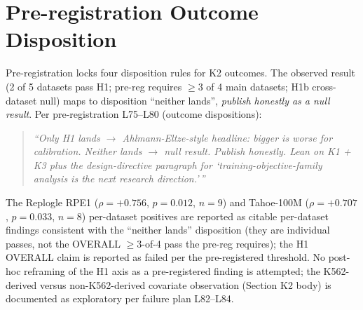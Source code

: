 \documentclass{article}
\begin{document}

\printAffiliationsAndNotice{}

\onecolumn
\appendix

\section{Pre-registration Outcome Disposition}
\label{app:prereg}

Pre-registration locks four disposition rules for K2 outcomes. The observed result (2 of 5 datasets pass H1; pre-reg requires $\geq 3$ of 4 main datasets; H1b cross-dataset null) maps to disposition ``neither lands'', \emph{publish honestly as a null result}. Per pre-registration L75--L80 (outcome dispositions):

\begin{quote}
\textit{``Only H1 lands $\to$ Ahlmann-Eltze-style headline: bigger is worse for calibration. Neither lands $\to$ null result. Publish honestly. Lean on K1 + K3 plus the design-directive paragraph for `training-objective-family analysis is the next research direction.'\,''}
\end{quote}

The Replogle RPE1 ($\rho = +0.756$, $p = 0.012$, $n = 9$) and Tahoe-100M ($\rho = +0.707$, $p = 0.033$, $n = 8$) per-dataset positives are reported as citable per-dataset findings consistent with the ``neither lands'' disposition (they are individual passes, not the OVERALL $\geq 3$-of-4 pass the pre-reg requires); the H1 OVERALL claim is reported as failed per the pre-registered threshold. No post-hoc reframing of the H1 axis as a pre-registered finding is attempted; the K562-derived versus non-K562-derived covariate observation (Section K2 body) is documented as exploratory per failure plan L82--L84.
\end{document}
